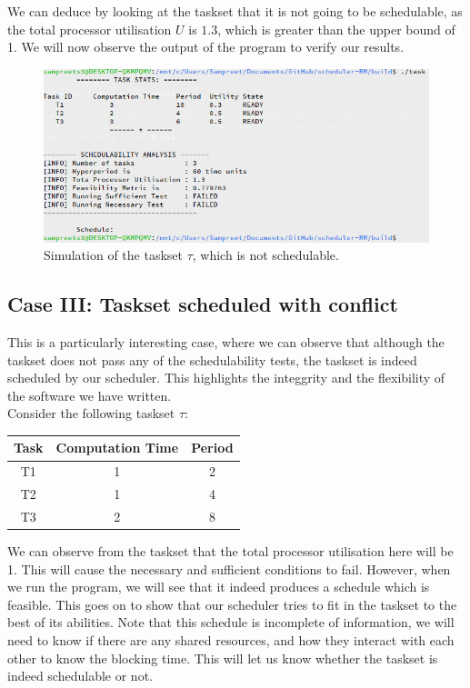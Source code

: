 We can deduce by looking at the taskset that it is not going to be schedulable, as the total processor utilisation $U$ is $1.3$, which is greater than the upper bound of 1. We will now observe the output of the program to verify our results.

\begin{figure}[h!]
\centering
  \includegraphics[scale=0.75]{../imgs/sim-case-2-output}
  \caption{Simulation of the taskset $\tau$, which is not schedulable.}
\end{figure}

\subsection{Case III: Taskset scheduled with conflict}

This is a particularly interesting case, where we can observe that although the taskset does not pass any of the schedulability tests, the taskset is indeed scheduled by our scheduler. This highlights the integgrity and the flexibility of the software we have written.\\

Consider the following taskset $\tau$:
\begin{center}
\begin{tabular}{|c|c|c|}
  \hline
  Task & Computation Time & Period \\
  \hline
  T1 & 1 & 2 \\
  \hline
  T2 & 1 & 4 \\
  \hline
  T3 & 2 & 8 \\
  \hline
\end{tabular}
\end{center}

We can observe from the taskset that the total processor utilisation here will be 1. This will cause the necessary and sufficient conditions to fail. However, when we run the program, we will see that it indeed produces a schedule which is feasible. This goes on to show that our scheduler tries to fit in the taskset to the best of its abilities. Note that this schedule is incomplete of information, we will need to know if there are any shared resources, and how they interact with each other to know the blocking time. This will let us know whether the taskset is indeed schedulable or not.

